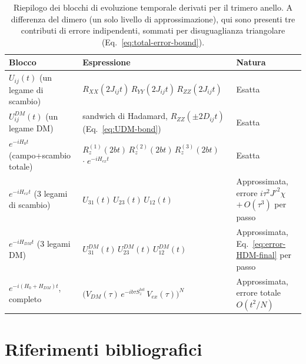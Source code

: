 \documentclass[11pt,a4paper]{article}
\begin{document}
\begin{table}[h]
\centering
\footnotesize
\begin{tabular}{@{}p{3.0cm}p{7.6cm}p{3.4cm}@{}}
\toprule
\textbf{Blocco} & \textbf{Espressione} & \textbf{Natura} \\
\midrule
$U_{ij}(t)$ \newline (un legame di scambio) & $R_{XX}(2J_{ij}t)\,R_{YY}(2J_{ij}t)\,R_{ZZ}(2J_{ij}t)$ & Esatta \\[6pt]
$U_{ij}^{DM}(t)$ \newline (un legame DM) & sandwich di Hadamard, $R_{ZZ}(\pm2D_{ij}t)$ \newline (Eq.~\ref{eq:UDM-bond}) & Esatta \\[6pt]
$e^{-iH_0t}$ \newline (campo+scambio totale) & $R_z^{(1)}(2bt)\,R_z^{(2)}(2bt)\,R_z^{(3)}(2bt)$ \newline $\cdot\; e^{-iH_{ex}t}$ & Esatta \\[6pt]
$e^{-iH_{ex}t}$ \newline (3 legami di scambio) & $U_{31}(t)\,U_{23}(t)\,U_{12}(t)$ & Approssimata, \newline errore $i\tau^2J'^2\chi$ \newline $+\,O(\tau^3)$ per passo \\[10pt]
$e^{-iH_{DM}t}$ \newline (3 legami DM) & $U_{31}^{DM}(t)\,U_{23}^{DM}(t)\,U_{12}^{DM}(t)$ & Approssimata, \newline Eq.~\ref{eq:error-HDM-final} \newline per passo \\[6pt]
$e^{-i(H_0+H_{DM})t}$, \newline completo & $\big(V_{DM}(\tau)\,e^{-ib\tau S_z^{tot}}\,V_{ex}(\tau)\big)^N$ & Approssimata, \newline errore totale $O(t^2/N)$ \\
\bottomrule
\end{tabular}
\caption{Riepilogo dei blocchi di evoluzione temporale derivati per il trimero anello. A differenza del dimero (un solo livello di approssimazione), qui sono presenti tre contributi di errore indipendenti, sommati per disuguaglianza triangolare (Eq.~\ref{eq:total-error-bound}).}
\label{tab:riepilogo-trimero}
\end{table}

\section*{Riferimenti bibliografici}
\end{document}
